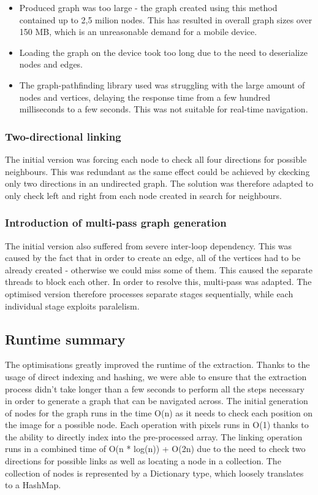 \documentclass[main.tex]{subfiles}
\begin{document}
\begin{itemize}

\item Produced graph was too large - the graph created using this method contained up to 2,5 milion nodes. This has resulted in overall graph sizes over 150 MB, which is an unreasonable demand for a mobile device.

\item Loading the graph on the device took too long due to the need to deserialize nodes and edges.

\item The graph-pathfinding library used was struggling with the large amount of nodes and vertices, delaying the response time from a few hundred milliseconds to a few seconds. This was not suitable for real-time navigation.

\end{itemize}
	

\subsubsection*{Two-directional linking}
	
The initial version was forcing each node to check all four directions for possible neighbours. This was redundant as the same effect could be achieved by ckecking only two directions in an undirected graph. The solution was therefore adapted to only check left and right from each node created in search for neighbours.

\subsubsection*{Introduction of multi-pass graph generation}
The initial version also suffered from severe inter-loop dependency. This was caused by the fact that in order to create an edge, all of the vertices had to be already created - otherwise we could miss some of them. This caused the separate threads to block each other. In order to resolve this, multi-pass was adapted.  The optimised version therefore processes separate stages sequentially, while each individual stage exploits paralelism.

\subsection*{Runtime summary}
The optimisations greatly improved the runtime of the extraction. Thanks to the usage of direct indexing and hashing, we were able to ensure that the extraction process didn't take longer than a few seconds to perform all the steps necessary in order to generate a graph that can be navigated across. The initial generation of nodes for the graph runs in the time O(n) as it needs to check each position on the image for a possible node. Each operation with pixels runs in O(1) thanks to the ability to directly index into the pre-processed array. The linking operation runs in a combined time of O(n * log(n)) + O(2n) due to the need to check two directions for possible links as well as locating a node in a collection. The collection of nodes is represented by a Dictionary type, which loosely translates to a HashMap. 
\end{document}
